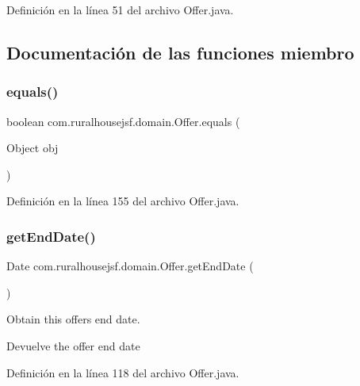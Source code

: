 Definición en la línea 51 del archivo Offer.\+java.



\subsection{Documentación de las funciones miembro}
\mbox{\label{classcom_1_1ruralhousejsf_1_1domain_1_1_offer_aea11cafbf3e7304d38630b80a3f4dc1e}} 
\subsubsection{\texorpdfstring{equals()}{equals()}}
{\footnotesize\ttfamily boolean com.\+ruralhousejsf.\+domain.\+Offer.\+equals (\begin{DoxyParamCaption}\item[{Object}]{obj }\end{DoxyParamCaption})}



Definición en la línea 155 del archivo Offer.\+java.

\mbox{\label{classcom_1_1ruralhousejsf_1_1domain_1_1_offer_aa6adb6e4f0999247d9426233f62b2185}} 
\subsubsection{\texorpdfstring{getEndDate()}{getEndDate()}}
{\footnotesize\ttfamily Date com.\+ruralhousejsf.\+domain.\+Offer.\+get\+End\+Date (\begin{DoxyParamCaption}{ }\end{DoxyParamCaption})}

Obtain this offers end date.

\begin{DoxyReturn}{Devuelve}
the offer end date 
\end{DoxyReturn}


Definición en la línea 118 del archivo Offer.\+java.

\mbox{\label{classcom_1_1ruralhousejsf_1_1domain_1_1_offer_aebea4d12647f454b017ef7102b70fd90}} 
